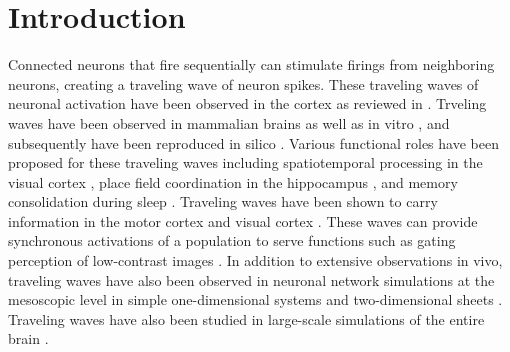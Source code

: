 
\chapter{Introduction}
Connected neurons that fire sequentially can stimulate firings from neighboring neurons, creating a traveling wave of neuron spikes. 
These traveling waves of neuronal activation have been observed in the cortex as reviewed in \citet{Muller2018}.
Trveling waves have been observed in mammalian brains \citep{Muller2018}\citep{reimer2010}  as well as in vitro \citep{wu2008}\citep{huang2004}\citep{Golomb1999}, and subsequently have been reproduced in silico \citep{keane2015}\citep{Senk2020}\citep{Golomb1996}\citep{ermentrout2001}. 
Various functional roles have been proposed for these traveling waves including spatiotemporal processing in the visual cortex \citep{wu2008}\citep{Muller2014}, place field coordination in the hippocampus \citep{lubernov2009}, and memory consolidation during sleep \citep{Dickey2021}.
Traveling waves have been shown to carry information in the  motor cortex \citep{Rubino2006} and visual cortex \citep{Besserve2015}.
These waves can provide synchronous activations of a population to serve functions such as gating perception of low-contrast images \citep{Davis2020}.
In addition to extensive observations in vivo, traveling waves have also been observed in neuronal network simulations at the mesoscopic level in simple one-dimensional systems \citep{Wilson1973}\citep{Golomb1999} and two-dimensional sheets \citep{keane2015}.
Traveling waves have also been studied in large-scale simulations of the entire brain \citep{Roberts2019}.

